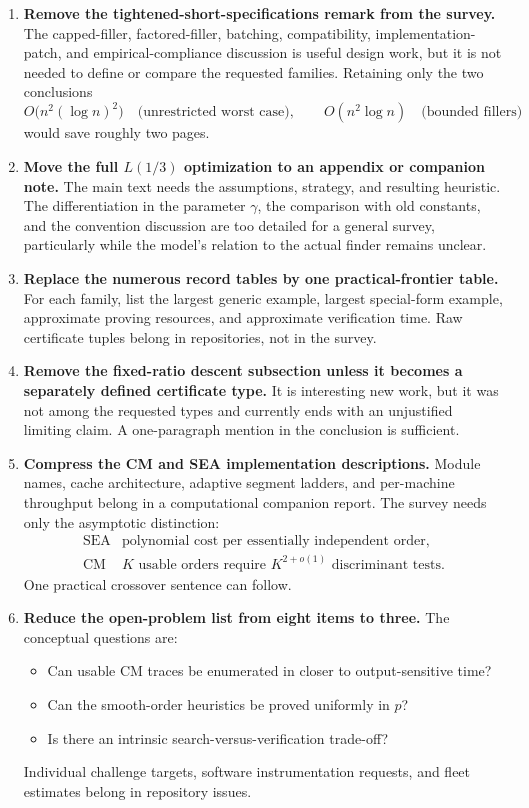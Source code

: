\documentclass[11pt]{amsart}
\begin{document}
\begin{enumerate}
\item \textbf{Remove the tightened-short-specifications remark from the survey.}  The capped-filler, factored-filler, batching, compatibility, implementation-patch, and empirical-compliance discussion is useful design work, but it is not needed to define or compare the requested families.  Retaining only the two conclusions
\[
 O\bigl(n^2(\log n)^2\bigr)
 \quad\text{(unrestricted worst case)},
 \qquad
 O(n^2\log n)
 \quad\text{(bounded fillers)}
\]
would save roughly two pages.

\item \textbf{Move the full $L(1/3)$ optimization to an appendix or companion note.}  The main text needs the assumptions, strategy, and resulting heuristic.  The differentiation in the parameter $\gamma$, the comparison with old constants, and the convention discussion are too detailed for a general survey, particularly while the model's relation to the actual finder remains unclear.

\item \textbf{Replace the numerous record tables by one practical-frontier table.}  For each family, list the largest generic example, largest special-form example, approximate proving resources, and approximate verification time.  Raw certificate tuples belong in repositories, not in the survey.

\item \textbf{Remove the fixed-ratio descent subsection unless it becomes a separately defined certificate type.}  It is interesting new work, but it was not among the requested types and currently ends with an unjustified limiting claim.  A one-paragraph mention in the conclusion is sufficient.

\item \textbf{Compress the CM and SEA implementation descriptions.}  Module names, cache architecture, adaptive segment ladders, and per-machine throughput belong in a computational companion report.  The survey needs only the asymptotic distinction:
\[
\begin{array}{c|c}
\text{SEA} & \text{polynomial cost per essentially independent order},\\
\text{CM} & K\text{ usable orders require }K^{2+o(1)}\text{ discriminant tests}.
\end{array}
\]
One practical crossover sentence can follow.

\item \textbf{Reduce the open-problem list from eight items to three.}  The conceptual questions are:
\begin{itemize}
\item Can usable CM traces be enumerated in closer to output-sensitive time?
\item Can the smooth-order heuristics be proved uniformly in $p$?
\item Is there an intrinsic search-versus-verification trade-off?
\end{itemize}
Individual challenge targets, software instrumentation requests, and fleet estimates belong in repository issues.


\end{enumerate}
\end{document}
